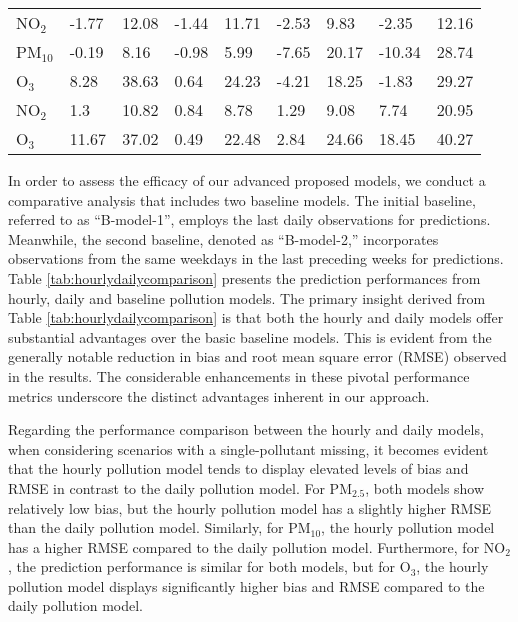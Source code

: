 \documentclass[
  12,
]{article}
\begin{document}
\begin{table}
\begin{tabular}[h]{lllllllll}
\hspace{1em}NO$_{2}$  & -1.77 & 12.08 & -1.44 & 11.71 & -2.53 & 9.83 & -2.35 & 12.16\\
\hspace{1em}PM$_{10}$ & -0.19 & 8.16 & -0.98 & 5.99 & -7.65 & 20.17 & -10.34 & 28.74\\
\hspace{1em}O$_{3}$   & 8.28 & 38.63 & 0.64 & 24.23 & -4.21 & 18.25 & -1.83 & 29.27\\
\hspace{1em}NO$_{2}$  & 1.3 & 10.82 & 0.84 & 8.78 & 1.29 & 9.08 & 7.74 & 20.95\\
\hspace{1em}O$_{3}$  & 11.67 & 37.02 & 0.49 & 22.48 & 2.84 & 24.66 & 18.45 & 40.27\\\hline
\end{tabular}
\end{table}

In order to assess the efficacy of our advanced proposed models, we
conduct a comparative analysis that includes two baseline models. The
initial baseline, referred to as ``B-model-1'', employs the last daily
observations for predictions. Meanwhile, the second baseline, denoted as
``B-model-2,'' incorporates observations from the same weekdays in the
last preceding weeks for predictions. Table
\ref{tab:hourlydailycomparison} presents the prediction performances
from hourly, daily and baseline pollution models. The primary insight
derived from Table \ref{tab:hourlydailycomparison} is that both the
hourly and daily models offer substantial advantages over the basic
baseline models. This is evident from the generally notable reduction in
bias and root mean square error (RMSE) observed in the results. The
considerable enhancements in these pivotal performance metrics
underscore the distinct advantages inherent in our approach.

Regarding the performance comparison between the hourly and daily
models, when considering scenarios with a single-pollutant missing, it
becomes evident that the hourly pollution model tends to display
elevated levels of bias and RMSE in contrast to the daily pollution
model. For PM\(_{2.5}\), both models show relatively low bias, but the
hourly pollution model has a slightly higher RMSE than the daily
pollution model. Similarly, for PM\(_{10}\), the hourly pollution model
has a higher RMSE compared to the daily pollution model. Furthermore,
for NO\(_2\), the prediction performance is similar for both models, but
for O\(_3\), the hourly pollution model displays significantly higher
bias and RMSE compared to the daily pollution model.
\end{document}
